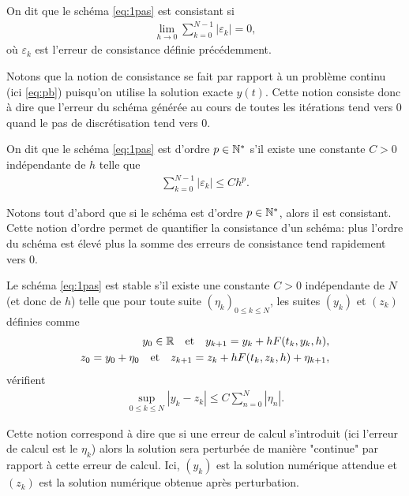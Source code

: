 \documentclass[12pt,a4paper,twoside]{article}
\begin{document}
\begin{definition}[Consistance]
  On dit que le sch\'ema \eqref{eq:1pas} est consistant si 
  \begin{align*}
    \lim_{h \to 0} \sum_{k=0}^{N-1} | \varepsilon_k | = 0 ,
  \end{align*}
  o\`u $\varepsilon_k$ est l'erreur de consistance d\'efinie pr\'ec\'edemment.
\end{definition}
Notons que la notion de consistance se fait par rapport \`a un probl\`eme continu
(ici \eqref{eq:pb}) puisqu'on utilise la solution exacte $y(t)$.
Cette notion consiste donc \`a dire que l'erreur du sch\'ema g\'en\'er\'ee
au cours de toutes les it\'erations tend vers 0 quand le pas de discr\'etisation
tend vers 0.



\begin{definition}[Ordre]
  On dit que le sch\'ema \eqref{eq:1pas} est d'ordre $p \in \mathbb{N}^*$ s'il existe
  une constante $C>0$ ind\'ependante de $h$ telle que
  \begin{align*}
    \sum_{k=0}^{N-1} | \varepsilon_k | \leq C h^{p} .
  \end{align*}
\end{definition}


Notons tout d'abord que si le sch\'ema est d'ordre $p \in \mathbb{N}^*$, alors il est consistant.
Cette notion d'ordre permet de quantifier la consistance d'un sch\'ema:
plus l'ordre du sch\'ema est \'elev\'e plus la somme des erreurs de consistance
tend rapidement vers 0.


\begin{definition}[Stabilit\'e]
  Le sch\'ema \eqref{eq:1pas} est stable s'il existe une constante $C > 0$
  ind\'ependante de $N$ (et donc de $h$) telle que pour toute suite 
  $(\eta_k)_{0 \leq k \leq N}$, les suites $(y_k)$ et $(z_k)$ d\'efinies comme
  \begin{align*}
    y_0 \in \mathbb{R} \quad \text{et} \quad y_{k+1} = y_k + h F(t_k,y_k,h) ,
    \\
    z_0 = y_0 + \eta_0 \quad \text{et} \quad z_{k+1} = z_k + h F(t_k,z_k,h) + \eta_{k+1} ,
  \end{align*}
  v\'erifient
  \begin{align*}
    \sup_{0 \leq k \leq N} | y_k - z_k | \leq C \sum_{n=0}^N | \eta_n | .
  \end{align*}
\end{definition}

Cette notion correspond \`a dire que si une erreur de calcul s'introduit
(ici l'erreur de calcul est le $\eta_k$) alors la solution sera perturb\'ee
de mani\`ere "continue" par rapport \`a cette erreur de calcul.
Ici, $(y_k)$ est la solution num\'erique attendue et $(z_k)$ est la solution
num\'erique obtenue apr\`es perturbation.
\end{document}
